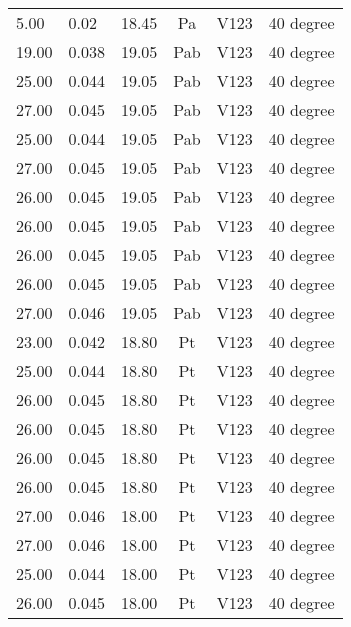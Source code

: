 \begin{table}[t]
\begin{tabular}{l | l | l | c | c | l}
5.00           & 0.02            & 18.45  & Pa       & V123   & 40 degree           \\
19.00          & 0.038           & 19.05  & Pab      & V123   & 40 degree           \\
25.00          & 0.044           & 19.05  & Pab      & V123   & 40 degree           \\
27.00          & 0.045           & 19.05  & Pab      & V123   & 40 degree           \\
25.00          & 0.044           & 19.05  & Pab      & V123   & 40 degree           \\
27.00          & 0.045           & 19.05  & Pab      & V123   & 40 degree           \\
26.00          & 0.045           & 19.05  & Pab      & V123   & 40 degree           \\
26.00          & 0.045           & 19.05  & Pab      & V123   & 40 degree           \\
26.00          & 0.045           & 19.05  & Pab      & V123   & 40 degree           \\
26.00          & 0.045           & 19.05  & Pab      & V123   & 40 degree           \\
27.00          & 0.046           & 19.05  & Pab      & V123   & 40 degree           \\
23.00          & 0.042           & 18.80  & Pt       & V123   & 40 degree           \\
25.00          & 0.044           & 18.80  & Pt       & V123   & 40 degree           \\
26.00          & 0.045           & 18.80  & Pt       & V123   & 40 degree           \\
26.00          & 0.045           & 18.80  & Pt       & V123   & 40 degree           \\
26.00          & 0.045           & 18.80  & Pt       & V123   & 40 degree           \\
26.00          & 0.045           & 18.80  & Pt       & V123   & 40 degree           \\
27.00          & 0.046           & 18.00  & Pt       & V123   & 40 degree           \\
27.00          & 0.046           & 18.00  & Pt       & V123   & 40 degree           \\
25.00          & 0.044           & 18.00  & Pt       & V123   & 40 degree           \\
26.00          & 0.045           & 18.00  & Pt       & V123   & 40 degree           \\
\end{tabular}
\end{table}

